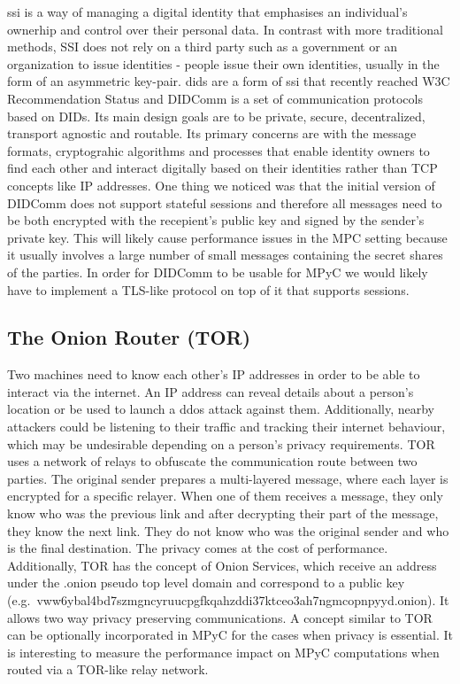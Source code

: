 \gls{ssi} is a way of managing a digital identity that emphasises an
individual's ownerhip and control over their personal data. In contrast
with more traditional methods, SSI does not rely on a third party such
as a government or an organization to issue identities - people issue
their own identities, usually in the form of an asymmetric key-pair.
\glspl{did}\autocite{didW3C} are a form of \gls{ssi} that recently
reached W3C Recommendation Status and DIDComm\autocite{didcommSpec} is a
set of communication protocols based on DIDs. Its main design goals are
to be private, secure, decentralized, transport agnostic and routable.
Its primary concerns are with the message formats, cryptograhic
algorithms and processes that enable identity owners to find each other
and interact digitally based on their identities rather than TCP
concepts like IP addresses. One thing we noticed was that the initial
version of DIDComm does not support stateful sessions and therefore all
messages need to be both encrypted with the recepient's public key and
signed by the sender's private key. This will likely cause performance
issues in the MPC setting because it usually involves a large number of
small messages containing the secret shares of the parties. In order for
DIDComm to be usable for MPyC we would likely have to implement a
TLS-like protocol on top of it that supports sessions.

\hypertarget{the-onion-router-tor}{%
\subsection{The Onion Router (TOR)}\label{the-onion-router-tor}}

Two machines need to know each other's IP addresses in order to be able
to interact via the internet. An IP address can reveal details about a
person's location or be used to launch a \gls{ddos} attack against them.
Additionally, nearby attackers could be listening to their traffic and
tracking their internet behaviour, which may be undesirable depending on
a person's privacy requirements. TOR uses a network of relays to
obfuscate the communication route between two parties. The original
sender prepares a multi-layered message, where each layer is encrypted
for a specific relayer. When one of them receives a message, they only
know who was the previous link and after decrypting their part of the
message, they know the next link. They do not know who was the original
sender and who is the final destination. The privacy comes at the cost
of performance. Additionally, TOR has the concept of Onion Services,
which receive an address under the .onion pseudo top level domain and
correspond to a public key
(e.g.~vww6ybal4bd7szmgncyruucpgfkqahzddi37ktceo3ah7ngmcopnpyyd.onion).
It allows two way privacy preserving communications. A concept similar
to TOR can be optionally incorporated in MPyC for the cases when privacy
is essential. It is interesting to measure the performance impact on
MPyC computations when routed via a TOR-like relay network.


